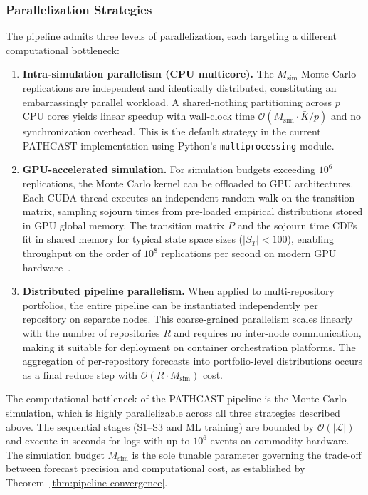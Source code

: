 \subsubsection{Parallelization Strategies}

The pipeline admits three levels of parallelization, each targeting a
different computational bottleneck:

\begin{enumerate}
    \item \textbf{Intra-simulation parallelism (CPU multicore).} The
    $M_{\text{sim}}$ Monte Carlo replications are independent and
    identically distributed, constituting an embarrassingly parallel
    workload. A shared-nothing partitioning across $p$ CPU cores yields
    linear speedup with wall-clock time
    $\mathcal{O}(M_{\text{sim}} \cdot \bar{K} / p)$ and no
    synchronization overhead. This is the default strategy in the current
    PATHCAST implementation using Python's \texttt{multiprocessing}
    module.

    \item \textbf{GPU-accelerated simulation.} For simulation budgets
    exceeding $10^6$ replications, the Monte Carlo kernel can be
    offloaded to GPU architectures. Each CUDA thread executes an
    independent random walk on the transition matrix, sampling sojourn
    times from pre-loaded empirical distributions stored in GPU global
    memory. The transition matrix $P$ and the sojourn time CDFs fit in
    shared memory for typical state space sizes ($|S_T| < 100$), enabling
    throughput on the order of $10^8$ replications per second on modern
    GPU hardware~\cite{lecuyer2017random}.

    \item \textbf{Distributed pipeline parallelism.} When applied to
    multi-repository portfolios, the entire pipeline can be instantiated
    independently per repository on separate nodes. This coarse-grained
    parallelism scales linearly with the number of repositories $R$ and
    requires no inter-node communication, making it suitable for
    deployment on container orchestration platforms. The aggregation of
    per-repository forecasts into portfolio-level distributions occurs as
    a final reduce step with $\mathcal{O}(R \cdot M_{\text{sim}})$ cost.
\end{enumerate}

\begin{remark}
\label{rem:scalability}
The computational bottleneck of the PATHCAST pipeline is the Monte
Carlo simulation, which is highly parallelizable across all three
strategies described above. The sequential stages (S1--S3 and ML training)
are bounded by $\mathcal{O}(|\mathcal{L}|)$ and execute in seconds for
logs with up to $10^6$ events on commodity hardware. The simulation
budget $M_{\text{sim}}$ is the sole tunable parameter governing the
trade-off between forecast precision and computational cost, as
established by Theorem~\ref{thm:pipeline-convergence}.
\end{remark}


